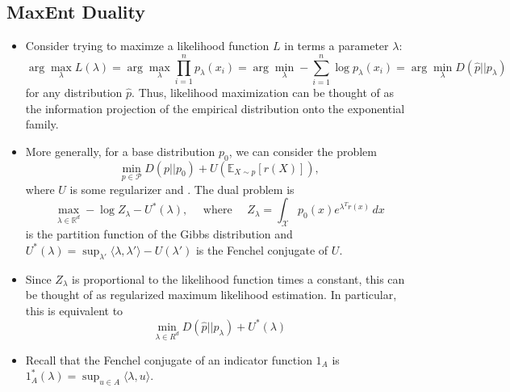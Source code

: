 \documentclass{article}
\newcommand{\R}{\mathbb{R}}                         %
\newcommand{\X}{\mathcal{X}}                        %
\newcommand{\E}{\mathbb{E}}                         %
\newcommand{\Pds}{\mathcal{P}}
\begin{document}
\subsection{MaxEnt Duality}
\begin{itemize}
\item Consider trying to maximze a likelihood function $L$ in terms a parameter
$\lambda$:
\[\arg\!\max_{\lambda} L(\lambda)
    = \arg\!\max_{\lambda} \prod_{i = 1}^n p_\lambda(x_i)
    = \arg\!\min_{\lambda} - \sum_{i = 1}^n \log p_\lambda(x_i)
    = \arg\!\min_{\lambda} D(\hat p || p_\lambda)
\]
for any distribution $\hat p$. Thus, likelihood maximization can be thought of
as the information projection of the empirical distribution onto the
exponential family.
\item More generally, for a base distribution $p_0$, we can consider the
problem
\[\min_{p \in \Pds} D(p || p_0) + U(\E_{X \sim p}[r(X)]),\]
where $U$ is some regularizer and . The dual problem is
\[\max_{\lambda \in \R^d} - \log Z_\lambda - U^*(\lambda),
\quad \mbox{ where } \quad
Z_\lambda = \int_\X p_0(x) e^{\lambda^T r(x)} \, dx\]
is the partition function of the Gibbs distribution and
$U^*(\lambda)
    = \sup_{\lambda'} \langle \lambda, \lambda' \rangle - U(\lambda')$ is the
Fenchel conjugate of $U$.
\item Since $Z_\lambda$ is proportional to the likelihood function times a
constant, this can be thought of as regularized maximum likelihood estimation.
In particular, this is equivalent to
\[\min_{\lambda \in R^d} D(\hat p || p_\lambda) + U^*(\lambda)\]
\item Recall that the Fenchel conjugate of an indicator function $1_A$ is
$1_A^*(\lambda) = \sup_{u \in A} \langle \lambda, u \rangle$.
\end{itemize}
\end{document}
